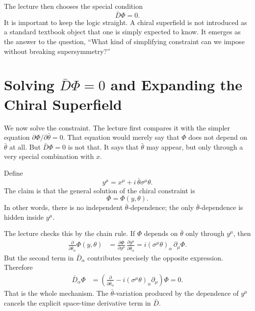 The lecture then chooses the special condition
\begin{equation}
\bar D\Phi=0.
\end{equation}
It is important to keep the logic straight. A chiral superfield is not introduced as a standard textbook object that one is simply expected to know. It emerges as the answer to the question, ``What kind of simplifying constraint can we impose without breaking supersymmetry?''

\section{Solving \(\bar D\Phi=0\) and Expanding the Chiral Superfield}

We now solve the constraint. The lecture first compares it with the simpler equation \(\partial\Phi/\partial\bar\theta=0\). That equation would merely say that \(\Phi\) does not depend on \(\bar\theta\) at all. But \(\bar D\Phi=0\) is not that. It says that \(\bar\theta\) may appear, but only through a very special combination with \(x\).

Define
\begin{equation}
y^\mu=x^\mu+i\,\bar\theta\sigma^\mu\theta.
\end{equation}
The claim is that the general solution of the chiral constraint is
\begin{equation}
\Phi=\Phi(y,\theta).
\end{equation}
In other words, there is no independent \(\bar\theta\)-dependence; the only \(\bar\theta\)-dependence is hidden inside \(y^\mu\).

The lecture checks this by the chain rule. If \(\Phi\) depends on \(\bar\theta\) only through \(y^\mu\), then
\begin{align}
\frac{\partial}{\partial\bar\theta_\alpha}\Phi(y,\theta)
&=
\frac{\partial\Phi}{\partial y^\mu}\,
\frac{\partial y^\mu}{\partial\bar\theta_\alpha}
=
i(\sigma^\mu\theta)_\alpha\,\partial_\mu\Phi.
\end{align}
But the second term in \(\bar D_\alpha\) contributes precisely the opposite expression. Therefore
\begin{align}
\bar D_\alpha \Phi
&=
\left(
\frac{\partial}{\partial\bar\theta_\alpha}
-
i(\sigma^\mu\theta)_\alpha\partial_\mu
\right)\Phi
=
0.
\end{align}
That is the whole mechanism. The \(\bar\theta\)-variation produced by the dependence of \(y^\mu\) cancels the explicit space-time derivative term in \(\bar D\).

